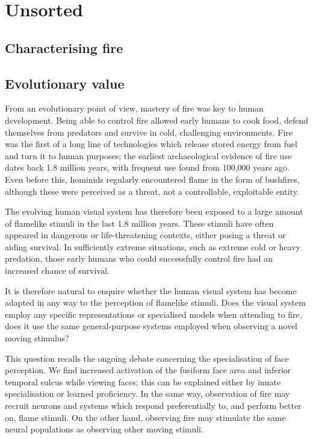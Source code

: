 \chapter{Unsorted}

\section{Characterising fire}

\section {Evolutionary value}

From an evolutionary point of view, mastery of fire was key to human development. Being able to control fire allowed early humans to cook food, defend themselves from predators and survive in cold, challenging environments. Fire was the first of a long line of technologies which release stored energy from fuel and turn it to human purposes; the earliest archaeological evidence of fire use dates back 1.8 million years, with frequent use found from 100,000 years ago\cite{bowman2009fire}. Even before this, hominids regularly encountered flame in the form of bushfires, although these were perceived as a threat, not a controllable, exploitable entity.

The evolving human visual system has therefore been exposed to a large amount of flamelike stimuli in the last 1.8 million years. These stimuli have often appeared in dangerous or life-threatening contexts, either posing a threat or aiding survival. In sufficiently extreme situations, such as extreme cold or heavy predation, those early humans who could successfully control fire had an increased chance of survival.

It is therefore natural to enquire whether the human visual system has become adapted in any way to the perception of flamelike stimuli. Does the visual system employ any specific representations or specialised models when attending to fire, does it use the same general-purpose systems employed when observing a novel moving stimulus?

This question recalls the ongoing debate concerning the specialisation of face perception. We find increased activation of the fusiform face area and inferior temporal sulcus while viewing faces\cite{allison2000social}; this can be explained either by innate specialisation or learned proficiency. In the same way, observation of fire may recruit neurons and systems which respond preferentially to, and perform better on, flame stimuli. On the other hand, observing fire may stimulate the same neural populations as observing other moving stimuli.

